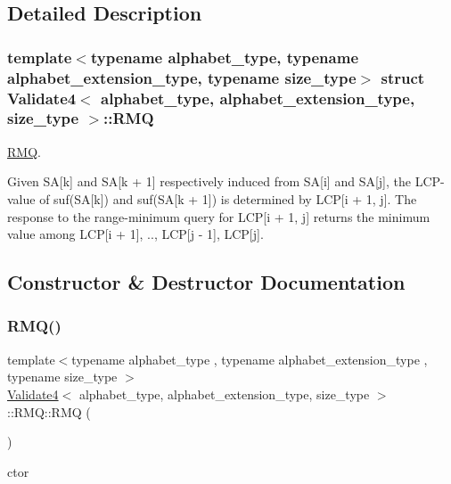 \subsection{Detailed Description}
\subsubsection*{template$<$typename alphabet\+\_\+type, typename alphabet\+\_\+extension\+\_\+type, typename size\+\_\+type$>$\newline
struct Validate4$<$ alphabet\+\_\+type, alphabet\+\_\+extension\+\_\+type, size\+\_\+type $>$\+::\+R\+MQ}

\hyperlink{struct_validate4_1_1_r_m_q}{R\+MQ}. 

Given SA\mbox{[}k\mbox{]} and SA\mbox{[}k + 1\mbox{]} respectively induced from SA\mbox{[}i\mbox{]} and SA\mbox{[}j\mbox{]}, the L\+C\+P-\/value of suf(\+S\+A\mbox{[}k\mbox{]}) and suf(SA\mbox{[}k + 1\mbox{]}) is determined by L\+CP\mbox{[}i + 1, j\mbox{]}. The response to the range-\/minimum query for L\+CP\mbox{[}i + 1, j\mbox{]} returns the minimum value among L\+CP\mbox{[}i + 1\mbox{]}, .., L\+CP\mbox{[}j -\/ 1\mbox{]}, L\+CP\mbox{[}j\mbox{]}. 

\subsection{Constructor \& Destructor Documentation}
\mbox{\label{struct_validate4_1_1_r_m_q_a58a58fb442194bba96116dd76b361882}} 
\subsubsection{\texorpdfstring{R\+M\+Q()}{RMQ()}}
{\footnotesize\ttfamily template$<$typename alphabet\+\_\+type , typename alphabet\+\_\+extension\+\_\+type , typename size\+\_\+type $>$ \\
\hyperlink{class_validate4}{Validate4}$<$ alphabet\+\_\+type, alphabet\+\_\+extension\+\_\+type, size\+\_\+type $>$\+::R\+M\+Q\+::\+R\+MQ (\begin{DoxyParamCaption}{ }\end{DoxyParamCaption})\hspace{0.3cm}{\ttfamily [inline]}}



ctor 



